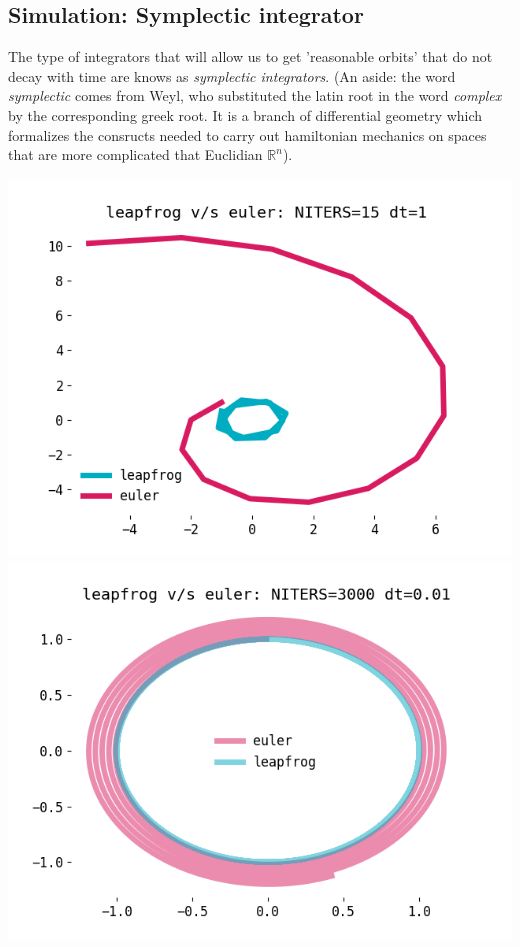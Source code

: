 \documentclass[titlepage]{article}
\newcommand{\R}{\mathbb{R}}
\begin{document}
\subsection{Simulation: Symplectic integrator}

The type of integrators that will allow us to get 'reasonable orbits' that
do not decay with time are knows as \emph{symplectic integrators}.
(An aside: the word \emph{symplectic} comes from Weyl, who substituted
the latin root in the word \emph{complex} by the corresponding greek root.
It is a branch of differential geometry which formalizes the consructs
needed to carry out hamiltonian mechanics on spaces that are more complicated
that Euclidian $\R^n$).


\includegraphics[width=\textwidth/2]{./leapfrog-dt-1.png}
\includegraphics[width=\textwidth/2]{./leapfrog-dt-1e-2.png}
\end{document}

